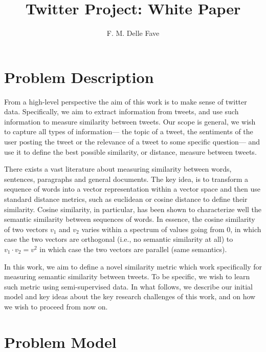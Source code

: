 \documentclass[letterpaper]{article}
\begin{document}
%
\title{Twitter Project: White Paper}
\author{F. M. Delle Fave
}
\maketitle

\section{Problem Description}

From a high-level perspective the aim of this work is to make sense of twitter data. Specifically, we aim to extract information from tweets, and use such information to measure similarity between tweets. Our scope is general, we wish to capture all types of information--- the topic of a tweet, the sentiments of the user posting the tweet or the relevance of a tweet to some specific question--- and use it to define the best possible similarity, or distance, measure between tweets.

There exists a vast literature about measuring similarity between words, sentences, paragraphs and general documents. The key idea, is to transform a sequence of words into a vector representation within a vector space and then use standard distance metrics, such as euclidean or cosine distance to define their similarity. Cosine similarity, in particular, has been shown to characterize well the semantic similarity between sequences of words. In essence, the cosine similarity of two vectors $v_1$ and $v_2$ varies within a spectrum of values going from $0$, in which case the two vectors are orthogonal (i.e., no semantic similarity at all) to $v_1 \cdot v_2 = v^2$ in which case the two vectors are parallel (same semantics). 

In this work, we aim to define a novel similarity metric which work specifically for measuring semantic similarity between tweets. To be specific, we wish to learn such metric using semi-supervised data. In what follows, we describe our initial model and key ideas about the key research challenges of this work, and on how we wish to proceed from now on. 

\section{Problem Model}
\end{document}
